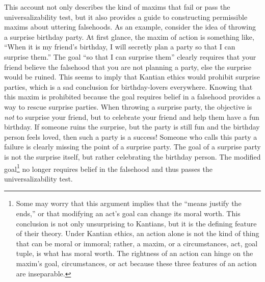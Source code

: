 \begin{isabellebody}
\begin{isamarkuptext}
This account not only describes the kind of maxims that fail or pass the universalizability test, but it 
also provides a guide to constructing permissible maxims about uttering falsehoods. As an example, 
consider the idea of throwing a surprise birthday party. At first glance, the maxim of action is 
something like, ``When it is my friend's birthday, I will secretly plan a party so that I can surprise
them.'' The goal ``so that I can surprise them'' clearly requires that your friend believe the falsehood that 
you are not planning a party, else the surprise would be ruined. This seems to imply that 
Kantian ethics would prohibit surprise parties, which is a sad conclusion for birthday-lovers everywhere. 
Knowing that this maxim is prohibited because the goal requires belief
in a falsehood provides a way to rescue surprise parties. When throwing a 
surprise party, the objective is \emph{not} to surprise your friend, but to celebrate
your friend and help them have a fun birthday. If someone ruins the surprise, but the party is still fun
and the birthday person feels loved, then such a party is a success! Someone who
calls this party a failure is clearly missing the point of a surprise party. The goal of 
a surprise party is not the surprise itself, but rather celebrating the birthday person. The modified
goal\footnote{Some may worry that this argument implies that the ``means justify the ends,'' or that modifying
an act's goal can change its moral worth. This conclusion is not only unsurprising to Kantians, but it is the
defining feature of their theory. Under Kantian ethics, an action alone is not the kind of thing that can 
be moral or immoral; rather, a maxim, or a circumstances, act, goal tuple, is what has moral worth. The rightness 
of an action can hinge on the maxim's goal, circumstances, or act because these three features
of an action are inseparable.} no longer requires belief in the falsehood and thus passes the 
universalizability test. 


\end{isamarkuptext}
\end{isabellebody}
